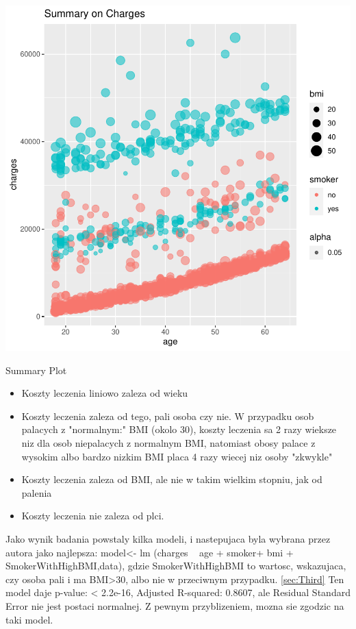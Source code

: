 \documentclass{article}
\begin{document}
\begin{centerfig}
\includegraphics{Untitled-002}
\caption{Summary Plot}
\end{centerfig}

\begin{itemize}
  \item Koszty leczenia liniowo zaleza od wieku
  \item Koszty leczenia zaleza od tego, pali osoba czy nie. W przypadku osob palacych z "normalnym:" BMI (okolo 30), koszty leczenia sa 2 razy wieksze
niz dla osob niepalacych z normalnym BMI, natomiast obosy palace z wysokim albo bardzo nizkim BMI placa 4 razy wiecej niz osoby "zkwykle"
  \item Koszty leczenia zaleza od BMI, ale nie w takim wielkim stopniu, jak od palenia
  \item Koszty leczenia nie zaleza od plci.
\end{itemize}
Jako wynik badania powstaly kilka modeli, i nastepujaca byla wybrana przez autora jako najlepsza:
model<- lm (charges ~ age + smoker+ bmi + SmokerWithHighBMI,data), gdzie SmokerWithHighBMI to wartosc, wskazujaca, czy osoba pali i  ma BMI>30, albo nie w przeciwnym przypadku.
\ref{sec:Third}
\newline
Ten model daje p-value: < 2.2e-16, Adjusted R-squared: 0.8607, ale Residual Standard Error nie jest postaci normalnej.
Z pewnym przyblizeniem, mozna sie zgodzic na taki model.
\end{document}
